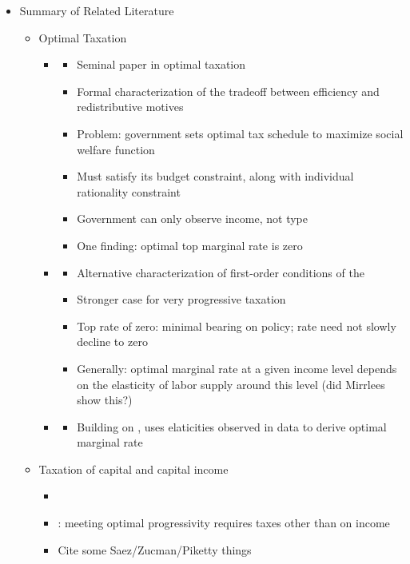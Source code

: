 \documentclass[11pt]{article}
\begin{document}
\begin{itemize}
        \item Summary of Related Literature
        \begin{itemize}
            \item Optimal Taxation
            \begin{itemize}
                \item \cite{mirrlees1971exploration}
                \begin{itemize}
                    \item Seminal paper in optimal taxation
                    \item Formal characterization of the tradeoff between efficiency and redistributive motives
                    \item Problem: government sets optimal tax schedule to maximize social welfare function
                    \item Must satisfy its budget constraint, along with individual rationality constraint
                    \item Government can only observe income, not type
                    \item One finding: optimal top marginal rate is zero
                \end{itemize}
                \item \cite{diamond1998optimal}
                \begin{itemize}
                    \item Alternative characterization of first-order conditions of the \cite{mirrlees1971exploration}
                    \item Stronger case for very progressive taxation 
                    \item Top rate of zero: minimal bearing on policy; rate need not slowly decline to zero 
                    \item Generally: optimal marginal rate at a given income level depends on the elasticity of labor supply around this level (did Mirrlees show this?)
                \end{itemize}
                \item \cite{saez2001using}
                \begin{itemize}
                    \item Building on \cite{diamond1998optimal}, uses elaticities observed in data to derive optimal marginal rate
                \end{itemize}
            \end{itemize}
            \item Taxation of capital and capital income 
            \begin{itemize}
                \item \cite{feldstein1978welfare}
                \item \cite{saez2019triumph}: meeting optimal progressivity requires taxes other than on income 
                \item Cite some Saez/Zucman/Piketty things
            \end{itemize}
            

\end{itemize}
\end{itemize}
\end{document}
